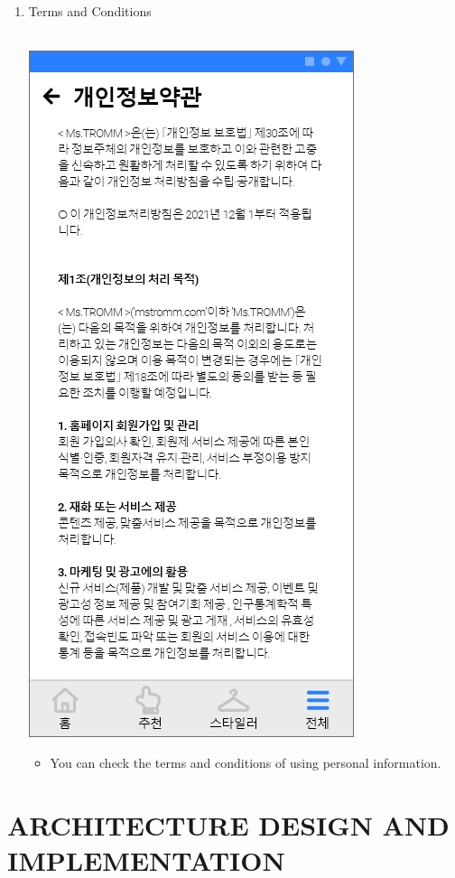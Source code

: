 \documentclass[conference]{IEEEtran}
\begin{document}
\begin{enumerate}
    \item Terms and Conditions \\ \\
    \centerline{\includegraphics[scale=0.32]{assets/개인정보약관.jpg}}
    \begin{itemize}
    \item[]You can check the terms and conditions of using personal information. \\
    \end{itemize}
\end{enumerate}

\section{ARCHITECTURE DESIGN AND IMPLEMENTATION}
\end{document}
